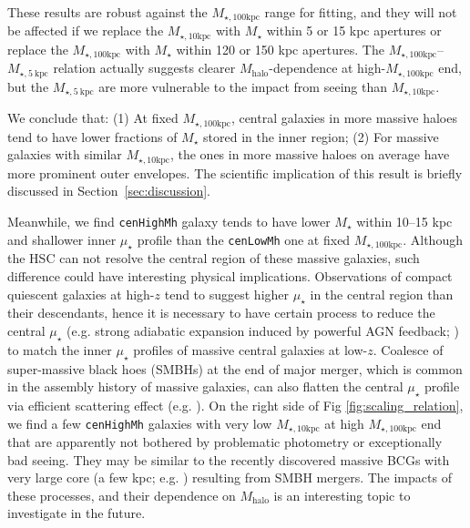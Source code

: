 \documentclass[a4paper,fleqn,usenatbib]{mnras}
\def\rbcg{\texttt{cenHighMh}}
\def\nbcg{\texttt{cenLowMh}}
\def\mstar{{$M_{\star}$}}
\def\mhalo{{$M_{\mathrm{halo}}$}}
\def\minn{{$M_{\star,10\mathrm{kpc}}$}}
\def\mtot{{$M_{\star,100\mathrm{kpc}}$}}
\def\mden{{$\mu_{\star}$}}
\begin{document}
    These results are robust against the \mtot{} range for fitting, and they will not 
    be affected if we replace the \minn{} with \mstar{} within 5 or 15 kpc apertures
    or replace the \mtot{} with \mstar{} within 120 or 150 kpc apertures.  
    The \mtot{}--$M_{\star, 5\ \mathrm{kpc}}$ relation actually suggests clearer 
    \mhalo{}-dependence at high-\mtot{} end, but the $M_{\star, 5\ \mathrm{kpc}}$ 
    are more vulnerable to the impact from seeing than \minn{}.
     
    We conclude that: 
    (1) At fixed \mtot{}, central galaxies in more massive haloes tend to have 
    lower fractions of \mstar{} stored in the inner region; 
    (2) For massive galaxies with similar \minn{}, the ones in more massive haloes on 
    average have more prominent outer envelopes. 
    The scientific implication of this result is briefly discussed in 
    Section~\ref{sec:discussion}.

    Meanwhile, we find \rbcg{} galaxy tends to have lower \mstar{} within 10--15 kpc 
    and shallower inner \mden{} profile than the \nbcg{} one at fixed \mtot{}. 
    Although the HSC can not resolve the central region of these massive galaxies, 
    such difference could have interesting physical implications. 
    Observations of compact quiescent galaxies at high-$z$ tend to suggest higher 
    \mden{} in the central region than their descendants, hence it is necessary to 
    have certain process to reduce the central \mden{} (e.g. strong adiabatic expansion 
    induced by powerful AGN feedback; \citealt{Fan2008}) to match the inner \mden{} 
    profiles of massive central galaxies at low-$z$.
    Coalesce of super-massive black hoes (SMBHs) at the end of major merger, which is 
    common in the assembly history of massive galaxies, can also flatten the central 
    \mden{} profile via efficient scattering effect (e.g. \citealt{Milosavljevi2002}).
    On the right side of Fig \ref{fig:scaling_relation}, we find a few \rbcg{} galaxies 
    with very low \minn{} at high \mtot{} end that are apparently not bothered by 
    problematic photometry or exceptionally bad seeing.  
    They may be similar to the recently discovered massive BCGs with very large core 
    (a few kpc; e.g. \citealt{Postman2012, LopezCruz2014}) resulting from SMBH mergers.
    The impacts of these processes, and their dependence on \mhalo{} is an interesting 
    topic to investigate in the future.
\end{document}
